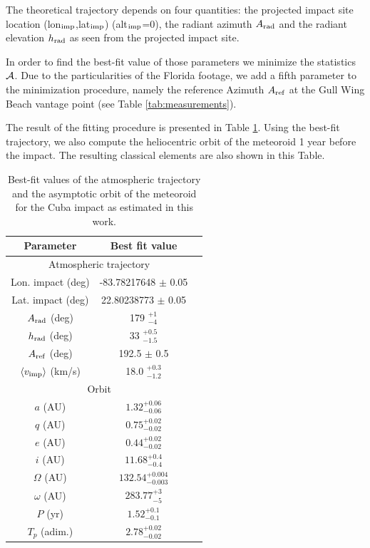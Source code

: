 \documentclass[fleqn,usenatbib]{mnras}
\begin{document}
The theoretical trajectory depends on four quantities: the projected impact site location (lon$_{\rm imp}$,lat$_{\rm imp}$) (alt$_{\rm imp}$=0), the radiant azimuth $A_{\rm rad}$ and the radiant elevation $h_{\rm rad}$ as seen from the projected impact site. 

In order to find the best-fit value of those parameters we minimize the statistics ${\cal A}$. Due to the particularities of the Florida footage, we add a fifth parameter to the minimization procedure, namely the reference Azimuth $A_{\rm ref}$ at the Gull Wing Beach vantage point (see Table \ref{tab:measurements}).

The result of the fitting procedure is presented in Table \ref{tab:fit}. Using the best-fit trajectory, we also compute the heliocentric orbit of the meteoroid 1 year before the impact. The resulting classical elements are also shown in this Table.

\begin{table}
\centering
\begin{tabular}{ccc}
\hline\hline
Parameter & Best fit value\\
\hline
\multicolumn{2}{c}{Atmospheric trajectory}\\
\hline
Lon. impact (deg) & -83.78217648 $\pm$ 0.05 \\
Lat. impact (deg) & 22.80238773 $\pm$ 0.05 \\
$A_{\rm rad}$ (deg) & 179 $^{+1}_{-4}$ \\
$h_{\rm rad}$ (deg) & 33 $^{+0.5}_{-1.5}$ \\
$A_{\rm ref}$ (deg) & 192.5 $\pm$ 0.5 \\
$\langle v_{\rm imp}\rangle$ (km/s) & 18.0 $^{+0.3}_{-1.2}$ \\
\hline
\multicolumn{2}{c}{Orbit}\\
\hline
$a$ (AU) & $1.32^{+0.06}_{-0.06}$\\
$q$ (AU) & $0.75^{+0.02}_{-0.02}$\\
$e$ (AU) & $0.44^{+0.02}_{-0.02}$\\
$i$ (AU) & $11.68^{+0.4}_{-0.4}$\\
$\Omega$ (AU) & $132.54^{+0.004}_{-0.003}$\\
$\omega$ (AU) & $283.77^{+3}_{-5}$\\
$P$ (yr) & $1.52^{+0.1}_{-0.1}$\\
$T_p$ (adim.) & $2.78^{+0.02}_{-0.02}$\\
\hline
\end{tabular}
\caption{Best-fit values of the atmospheric trajectory and the asymptotic orbit of the meteoroid for the Cuba impact as estimated in this work.}
\label{tab:fit}
\end{table}
\end{document}
